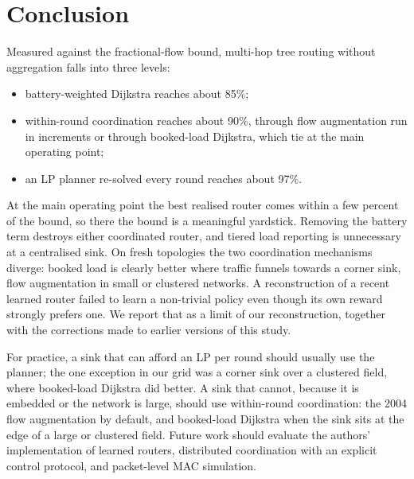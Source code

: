 \section{Conclusion}\label{sec:conclusion}

Measured against the fractional-flow bound, multi-hop tree routing without aggregation falls into three levels:
\begin{itemize}[leftmargin=*]
  \item battery-weighted Dijkstra reaches about 85\%;
  \item within-round coordination reaches about 90\%, through flow augmentation run in increments or through booked-load Dijkstra, which tie at the main operating point;
  \item an LP planner re-solved every round reaches about 97\%.
\end{itemize}
At the main operating point the best realised router comes within a few percent of the bound, so there the bound is a meaningful yardstick. Removing the battery term destroys either coordinated router, and tiered load reporting is unnecessary at a centralised sink. On fresh topologies the two coordination mechanisms diverge: booked load is clearly better where traffic funnels towards a corner sink, flow augmentation in small or clustered networks. A reconstruction of a recent learned router failed to learn a non-trivial policy even though its own reward strongly prefers one. We report that as a limit of our reconstruction, together with the corrections made to earlier versions of this study.

For practice, a sink that can afford an LP per round should usually use the planner; the one exception in our grid was a corner sink over a clustered field, where booked-load Dijkstra did better. A sink that cannot, because it is embedded or the network is large, should use within-round coordination: the 2004 flow augmentation by default, and booked-load Dijkstra when the sink sits at the edge of a large or clustered field. Future work should evaluate the authors' implementation of learned routers, distributed coordination with an explicit control protocol, and packet-level MAC simulation.
